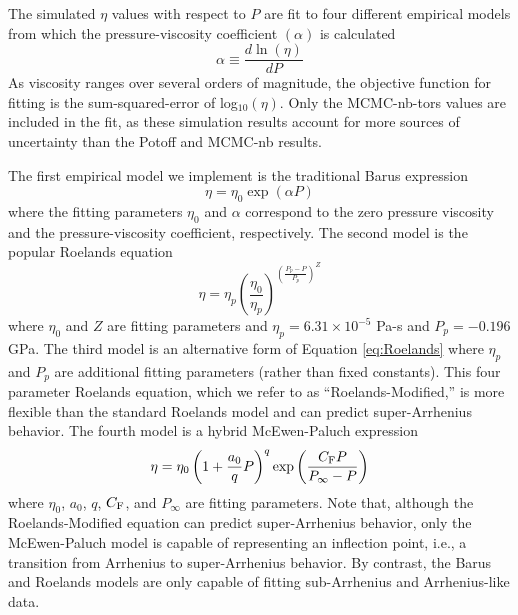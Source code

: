 \documentclass[preprint,review,12pt]{elsarticle}
\begin{document}
    The simulated $\eta$ values with respect to $P$ are fit to four different empirical models from which the pressure-viscosity coefficient $(\alpha)$ is calculated
    \begin{equation}
    \alpha \equiv \frac{d\ln(\eta)}{dP}
    \end{equation}
    As viscosity ranges over several orders of magnitude, the objective function for fitting is the sum-squared-error of log$_{10}(\eta)$. Only the MCMC-nb-tors values are included in the fit, as these simulation results account for more sources of uncertainty than the Potoff and MCMC-nb results. 
    
           
    The first empirical model we implement is the traditional Barus expression \cite{Barus1893}
	\begin{equation} \label{eq:Barus}
	\eta = \eta_0 \exp(\alpha P)
	\end{equation}
	where the fitting parameters $\eta_0$ and $\alpha$ correspond to the zero pressure viscosity and the pressure-viscosity coefficient, respectively. The second model is the popular Roelands equation \cite{Roelands1966}	
	\begin{equation} \label{eq:Roelands}
	\eta = \eta_p \left(\frac{\eta_0}{\eta_p}\right)^{\left(\frac{P_p - P}{P_p}\right)^Z}
	\end{equation}
	where $\eta_0$ and $Z$ are fitting parameters and $\eta_p = 6.31 \times 10^{-5}$ Pa-s and $P_p = -0.196$ GPa. The third model is an alternative form of Equation \ref{eq:Roelands} where $\eta_p$ and $P_p$ are additional fitting parameters (rather than fixed constants). This four parameter Roelands equation, which we refer to as ``Roelands-Modified,'' is more flexible than the standard Roelands model and can predict super-Arrhenius behavior. The fourth model is a hybrid McEwen-Paluch expression \cite{Bair2016}	
	\begin{equation} \label{eq:McEwen-Paluch}
	\eta = \eta_0 \left(1 + \frac{a_0}{q} P\right)^q \exp\left(\frac{C_{\rm F} P}{P_\infty - P}\right)
	\end{equation}
	where $\eta_0$, $a_0$, $q$, $C_{\rm F}$, and $P_\infty$ are fitting parameters.  Note that, although the Roelands-Modified equation can predict super-Arrhenius behavior, only the McEwen-Paluch model is capable of representing an inflection point, i.e., a transition from Arrhenius to super-Arrhenius behavior. By contrast, the Barus and Roelands models are only capable of fitting sub-Arrhenius and Arrhenius-like data.
	
\end{document}
